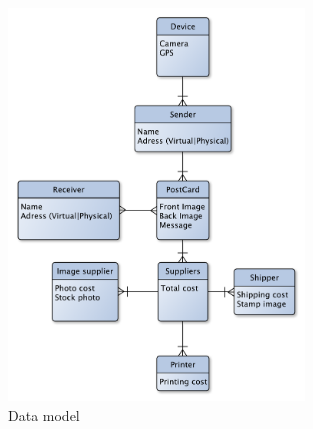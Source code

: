 \documentclass[10pt,a4paper]{article}
\begin{document}
\begin{figure}[h!]
\centering
\includegraphics[width=0.7\textwidth]{DataModel.pdf}
\caption{Data model}
\label{fig:datamodel}
\end{figure}
\end{document}
